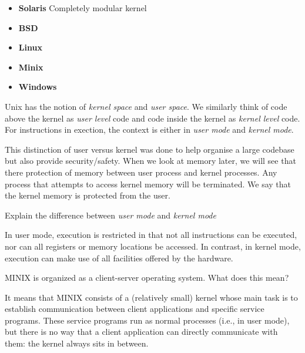 \begin{itemize}   
\renewcommand{\labelitemi}{$\Box$}
\item \textbf{Solaris} 
Completely modular kernel
\item \textbf{BSD} 
\item \textbf{Linux} 
\item \textbf{Minix} 
\item \textbf{Windows} 
\end{itemize}

Unix has the notion of \textit{kernel space} and \textit{user space}. 
We similarly think of code above the kernel as \textit{user level} code and 
code inside the kernel as \textit{kernel level} code.
For instructions in exection, the context is either in 
\textit{user mode} and \textit{kernel mode}.

This distinction of user versus kernel
 was done to help organise a large codebase but also provide security/safety.
When we look at memory later, we will see that there protection of 
memory between user process and kernel processes. Any process that attempts to access 
kernel memory will be terminated. We say that the kernel memory is protected from the user. 

\begin{example}
Explain the difference between \textit{user mode} and \textit{kernel mode}

In user mode, execution is restricted in that not all instructions can be executed, nor can all registers or memory locations be accessed. In contrast, in kernel mode, execution can make use of all facilities offered by the hardware.
\end{example}


\begin{example}
MINIX is organized as a client-server operating system. What does this mean?

It means that MINIX consists of a (relatively small) kernel whose main task is to establish communication between client applications and speciﬁc service programs. These service programs run
as normal processes (i.e., in user mode), but there is no way that a client application can directly
communicate with them: the kernel always sits in between.
\end{example}

